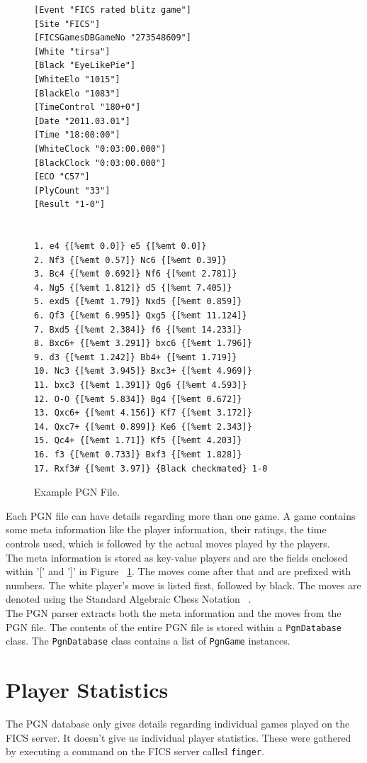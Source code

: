 \documentclass{article}
\begin{document}
\begin{figure}[htp]
\begin{center}
\begin{verbatim}
[Event "FICS rated blitz game"]
[Site "FICS"]
[FICSGamesDBGameNo "273548609"]
[White "tirsa"]
[Black "EyeLikePie"]
[WhiteElo "1015"]
[BlackElo "1083"]
[TimeControl "180+0"]
[Date "2011.03.01"]
[Time "18:00:00"]
[WhiteClock "0:03:00.000"]
[BlackClock "0:03:00.000"]
[ECO "C57"]
[PlyCount "33"]
[Result "1-0"]


1. e4 {[%emt 0.0]} e5 {[%emt 0.0]} 
2. Nf3 {[%emt 0.57]} Nc6 {[%emt 0.39]} 
3. Bc4 {[%emt 0.692]} Nf6 {[%emt 2.781]} 
4. Ng5 {[%emt 1.812]} d5 {[%emt 7.405]} 
5. exd5 {[%emt 1.79]} Nxd5 {[%emt 0.859]} 
6. Qf3 {[%emt 6.995]} Qxg5 {[%emt 11.124]} 
7. Bxd5 {[%emt 2.384]} f6 {[%emt 14.233]} 
8. Bxc6+ {[%emt 3.291]} bxc6 {[%emt 1.796]} 
9. d3 {[%emt 1.242]} Bb4+ {[%emt 1.719]} 
10. Nc3 {[%emt 3.945]} Bxc3+ {[%emt 4.969]} 
11. bxc3 {[%emt 1.391]} Qg6 {[%emt 4.593]} 
12. O-O {[%emt 5.834]} Bg4 {[%emt 0.672]} 
13. Qxc6+ {[%emt 4.156]} Kf7 {[%emt 3.172]} 
14. Qxc7+ {[%emt 0.899]} Ke6 {[%emt 2.343]} 
15. Qc4+ {[%emt 1.71]} Kf5 {[%emt 4.203]} 
16. f3 {[%emt 0.733]} Bxf3 {[%emt 1.828]} 
17. Rxf3# {[%emt 3.97]} {Black checkmated} 1-0

\end{verbatim}
\end{center}
\caption{Example PGN File.}
\label{fig:pgn}
\end{figure}

Each PGN file can have details regarding more than one game. A game contains some meta information like the player information, their ratings, the time controls used, which is followed by the actual moves played by the players.\\

The meta information is stored as key-value players and are the fields enclosed within '[' and ']' in Figure ~\ref{fig:pgn}. The moves come after that and are prefixed with numbers. The white player's move is listed first, followed by black. The moves are denoted using the Standard Algebraic Chess Notation ~\cite{wiki:san}. \\

The PGN parser extracts both the meta information and the moves from the PGN file. The contents of the entire PGN file is stored within a \verb=PgnDatabase= class. The \verb=PgnDatabase= class contains a list of \verb=PgnGame= instances.

\section{Player Statistics}
\label{sec:pstats}
The PGN database only gives details regarding individual games played on the FICS server. It doesn't give us individual player statistics. These were gathered by executing a command on the FICS server called \verb=finger=. 
\end{document}
